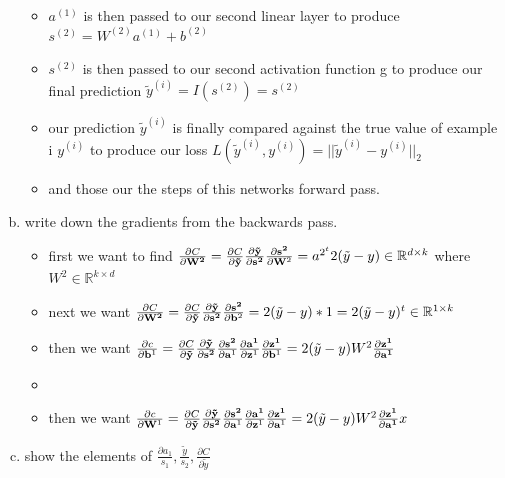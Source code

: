 \documentclass{article}
\begin{document}
\begin{enumerate}[(a)]
\begin{itemize}
    \item $a^{(1)}$ is then passed to our second linear layer to produce $s^{(2)}=W^{(2)}a^{(1)}+b^{(2)}$
    \item $s^{(2)}$ is then passed to our second activation function g to produce our final prediction $\tilde{y}^{(i)}= I(s^{(2)})=s^{(2)}$
    \item our prediction $\tilde{y}^{(i)}$ is finally compared against the true value of example i $y^{(i)}$ to produce our loss $L(\tilde{y}^{(i)}, y^{(i)})=||\tilde{y}^{(i)}-y^{(i)}||_2$
    \item and those our the steps of this networks forward pass.
\end{itemize}
\item write down the gradients from the backwards pass. 
\begin{itemize}
   \color{blue}
    \item first we want to find $\frac{\partial C}{\partial \bold{W^2}}=\frac{\partial C}{\partial \bold{\tilde{y}}}\frac{\partial \bold{\tilde{y}}}{\partial \bold{s^2}}\frac{\partial \bold{s^2}}{\partial \bold W^2}=a^{2^t} 2(\tilde{y}-y)\in \mathbb{R}^{d\times k} $ where $W^2\in \mathbb{R}^{k\times d}$
    \item next we want $\frac{\partial C}{\partial \bold{W^2}}=\frac{\partial C}{\partial \bold{\tilde{y}}}\frac{\partial \bold{\tilde{y}}}{\partial \bold{s^2}}\frac{\partial \bold{s^2}}{\partial \bold b^2}=2(\tilde{y}-y)*1=2(\tilde{y}-y)^t\in \mathbb{R}^{1\times k } $
    \item then we want $\frac{\partial c}{\partial \bold b^1}= \frac{\partial C}{\partial \bold{\tilde{y}}}\frac{\partial \bold{\tilde{y}}}{\partial \bold{s^2}}\frac{\partial \bold{s^2}}{\partial \bold a^1}\frac{\partial \bold{a^1}}{\partial \bold z^1}\frac{\partial \bold{z^1}}{\partial \bold b^1}=2(\tilde{y}-y)W^{2}\frac{\partial \bold{ z^1}}{\partial \bold{a^1}}$
    \item \item then we want $\frac{\partial c}{\partial \bold W^1}= \frac{\partial C}{\partial \bold{\tilde{y}}}\frac{\partial \bold{\tilde{y}}}{\partial \bold{s^2}}\frac{\partial \bold{s^2}}{\partial \bold a^1}\frac{\partial \bold{a^1}}{\partial \bold z^1}\frac{\partial \bold{z^1}}{\partial \bold a^1}=2(\tilde{y}-y)W^{2}\frac{\partial \bold{ z^1}}{\partial \bold{a^1}}x $
\end{itemize}
\item show the elements of $\frac{\partial a_{1}}{s_{1}}, \frac{\tilde{y}}{s_2}, \frac{\partial C}{\partial \tilde{y}}$

\end{enumerate}
\end{document}
